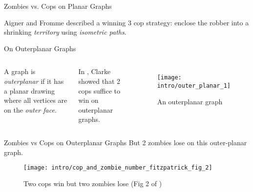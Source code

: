 \begin{frame}{Zombies vs. Cops on Planar Graphs}

Aigner and Fromme \cite{aigner1984game} described a winning 3 cop strategy: enclose the robber into a shrinking \textit{territory} using \textit{isometric paths}.

\vspace{1cm}

\end{frame}

\begin{frame}{On Outerplanar Graphs}
  \begin{columns}[onlytextwidth,T]
  A graph is \textit{outerplanar} if it has a planar drawing where all vertices are on the \textit{outer face}.

  \vspace{0.5cm}

  In \cite{clarke2002constrained}, Clarke showed that 2 cops suffice to win on outerplanar graphs.
  \begin{figure}
    \texttt{[image: intro/outer\_planar\_1]}
    \caption{An outerplanar graph}
  \end{figure}
  \end{columns}
\end{frame}

\begin{frame}{Zombies vs Cops on Outerplanar Graphs}
  But 2 zombies lose on this outer-planar graph.
  \begin{figure}
    \centering
    \texttt{[image: intro/cop\_and\_zombie\_number\_fitzpatrick\_fig\_2]}
    \caption{Two cops win but two zombies lose (Fig 2 of \cite{fitzpatrick2016deterministic})\label{zombie_number_differ}}
\end{figure}
\end{frame}
